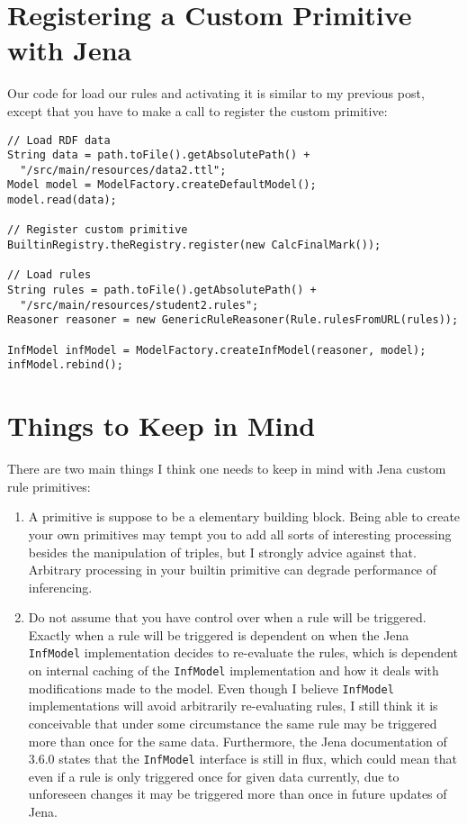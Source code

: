\documentclass{amsart}
\begin{document}
\section{Registering a Custom Primitive with Jena}
Our code for load our rules and activating it is similar to my previous post, except that you have to make a call to register the custom primitive:
\begin{small}
\begin{verbatim} 
// Load RDF data
String data = path.toFile().getAbsolutePath() + 
  "/src/main/resources/data2.ttl";
Model model = ModelFactory.createDefaultModel();
model.read(data);
      
// Register custom primitive
BuiltinRegistry.theRegistry.register(new CalcFinalMark());
      
// Load rules
String rules = path.toFile().getAbsolutePath() + 
  "/src/main/resources/student2.rules";
Reasoner reasoner = new GenericRuleReasoner(Rule.rulesFromURL(rules));
     
InfModel infModel = ModelFactory.createInfModel(reasoner, model);  
infModel.rebind();   
\end{verbatim}
\end{small}


\section{Things to Keep in Mind}
There are two main things I think one needs to keep in mind with Jena custom rule primitives:
\begin{enumerate}
 \item A primitive is suppose to be a elementary building block. Being able to create your own primitives may tempt you to add all sorts of interesting processing besides the manipulation of triples, but I strongly advice against that. Arbitrary processing in your builtin primitive can degrade performance of inferencing.
 \item Do not assume that you have control over when a rule will be triggered. Exactly when a rule will be triggered is dependent on when the Jena \texttt{InfModel} implementation decides to re-evaluate the rules, which is dependent on internal caching of the \texttt{InfModel} implementation and how it deals with modifications made to the model. Even though I believe \texttt{InfModel} implementations will avoid arbitrarily re-evaluating rules, I still think it is conceivable that under some circumstance the same rule may be triggered more than once for the same data. Furthermore, the Jena documentation of 3.6.0 states that the \texttt{InfModel} interface is still in flux, which could mean that even if a rule is only triggered once for given data currently, due to unforeseen changes it may be triggered more than once in future updates of Jena.
\end{enumerate}
\end{document}
